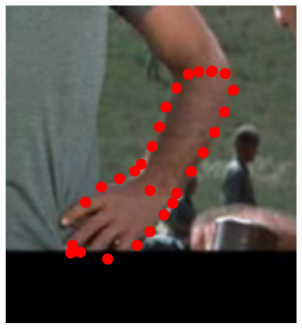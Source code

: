 \begin{figure}[!t]
    \hfill
    \includegraphics[height=\ofh]{resources/Fittings/6.eps}
    \hfill

\end{figure}
